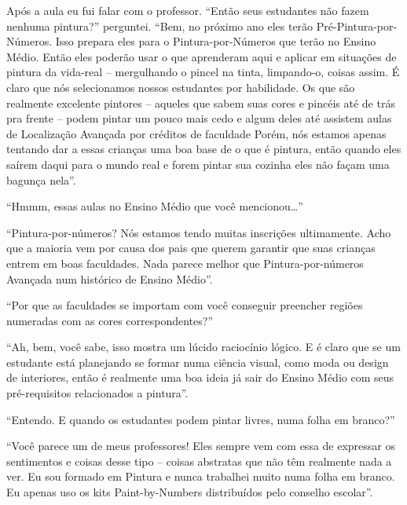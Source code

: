 \documentclass[a4paper,oneside,12pt,notitlepage]{article}
\begin{document}
Após a aula eu fui falar com o professor.
``Então seus estudantes não fazem nenhuma pintura?''
perguntei.
``Bem, no próximo ano eles terão Pré-Pintura-por-Números.
Isso prepara eles para o Pintura-por-Números que terão no Ensino Médio.
Então eles poderão usar o que aprenderam aqui e aplicar em situações de pintura da vida-real -- mergulhando o pincel na tinta, limpando-o, coisas assim.
É claro que nós selecionamos nossos estudantes por habilidade.
Os que são realmente excelente pintores -- aqueles que sabem suas cores e pincéis até de trás pra frente -- podem pintar um pouco mais cedo e algum deles até assistem aulas de Localização Avançada por créditos de faculdade
Porém, nós estamos apenas tentando dar a essas crianças uma boa base de o que é pintura, então quando eles saírem daqui para o mundo real e forem pintar sua cozinha eles não façam uma bagunça nela''.

``Hmmm, essas aulas no Ensino Médio que você mencionou\ldots{}''

``Pintura-por-números?
Nós estamos tendo muitas inscrições ultimamente.
Acho que a maioria vem por causa dos pais que querem garantir que suas crianças entrem em boas faculdades.
Nada parece melhor que Pintura-por-números Avançada num histórico de Ensino Médio''.

``Por que as faculdades se importam com você conseguir preencher regiões numeradas com as cores correspondentes?''

``Ah, bem, você sabe, isso mostra um lúcido raciocínio lógico.
E é claro que se um estudante está planejando se formar numa ciência visual, como moda ou design de interiores, então é realmente uma boa ideia já sair do Ensino Médio com seus pré-requisitos relacionados a pintura''.

``Entendo.
E quando os estudantes podem pintar livres, numa folha em branco?''

``Você parece um de meus professores!
Eles sempre vem com essa de expressar os sentimentos e coisas desse tipo -- coisas abstratas que não têm realmente nada a ver.
Eu sou formado em Pintura e nunca trabalhei muito numa folha em branco.
Eu apenas uso os kits Paint-by-Numbers distribuídos pelo conselho escolar''.
\end{document}
